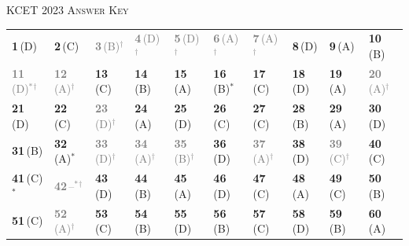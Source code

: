 \par{}\vspace{14pt}
\begin{center}{}\par
{\large\color{navy}\scshape KCET 2023 \textperiodcentered{} Answer Key}\end{center}
{\small\setlength{\tabcolsep}{1pt}\renewcommand{\arraystretch}{1.5}
\begin{tabularx}{\linewidth}{@{}*{10}{>{\centering\arraybackslash}X}@{}}\toprule
\textbf{1}\,(D) & \textbf{2}\,(C) & \textcolor{gray}{\textbf{3}\,(B)$^{\dagger}$} & \textcolor{gray}{\textbf{4}\,(D)$^{\dagger}$} & \textcolor{gray}{\textbf{5}\,(D)$^{\dagger}$} & \textcolor{gray}{\textbf{6}\,(A)$^{\dagger}$} & \textcolor{gray}{\textbf{7}\,(A)$^{\dagger}$} & \textbf{8}\,(D) & \textbf{9}\,(A) & \textbf{10}\,(B)\\
\textcolor{gray}{\textbf{11}\,(D)$^{*}$$^{\dagger}$} & \textcolor{gray}{\textbf{12}\,(A)$^{\dagger}$} & \textbf{13}\,(C) & \textbf{14}\,(B) & \textbf{15}\,(A) & \textbf{16}\,(B)$^{*}$ & \textbf{17}\,(C) & \textbf{18}\,(D) & \textbf{19}\,(A) & \textcolor{gray}{\textbf{20}\,(A)$^{\dagger}$}\\
\textbf{21}\,(D) & \textbf{22}\,(C) & \textcolor{gray}{\textbf{23}\,(D)$^{\dagger}$} & \textbf{24}\,(A) & \textbf{25}\,(D) & \textbf{26}\,(C) & \textbf{27}\,(C) & \textbf{28}\,(B) & \textbf{29}\,(A) & \textbf{30}\,(D)\\
\textbf{31}\,(B) & \textbf{32}\,(A)$^{*}$ & \textcolor{gray}{\textbf{33}\,(D)$^{\dagger}$} & \textcolor{gray}{\textbf{34}\,(A)$^{\dagger}$} & \textcolor{gray}{\textbf{35}\,(B)$^{\dagger}$} & \textbf{36}\,(D) & \textcolor{gray}{\textbf{37}\,(A)$^{\dagger}$} & \textbf{38}\,(D) & \textcolor{gray}{\textbf{39}\,(C)$^{\dagger}$} & \textbf{40}\,(C)\\
\textbf{41}\,(C)$^{*}$ & \textcolor{gray}{\textbf{42}\,--$^{*}$$^{\dagger}$} & \textbf{43}\,(D) & \textbf{44}\,(B) & \textbf{45}\,(A) & \textbf{46}\,(D) & \textbf{47}\,(C) & \textbf{48}\,(A) & \textbf{49}\,(C) & \textbf{50}\,(B)\\
\textbf{51}\,(C) & \textcolor{gray}{\textbf{52}\,(A)$^{\dagger}$} & \textbf{53}\,(C) & \textbf{54}\,(B) & \textbf{55}\,(D) & \textbf{56}\,(B) & \textbf{57}\,(C) & \textbf{58}\,(D) & \textbf{59}\,(B) & \textbf{60}\,(A)\\\bottomrule\end{tabularx}}\par\smallskip
